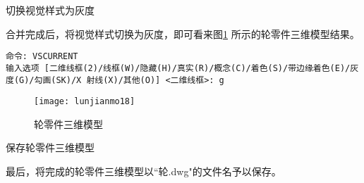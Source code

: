 \begin{procedure}
\item 切换视觉样式为灰度

合并完成后，将视觉样式切换为灰度，即可看来图\ref{fig:lunjianmo18} 所示的轮零件三维模型结果。
\begin{lstlisting}
命令: VSCURRENT
输入选项 [二维线框(2)/线框(W)/隐藏(H)/真实(R)/概念(C)/着色(S)/带边缘着色(E)/灰度(G)/勾画(SK)/X 射线(X)/其他(O)] <二维线框>: g
\end{lstlisting}

\begin{figure}[htbp]
\centering
\texttt{[image: lunjianmo18]}
\caption{轮零件三维模型}\label{fig:lunjianmo18}
\end{figure}
\item 保存轮零件三维模型

最后，将完成的轮零件三维模型以“轮.dwg"的文件名予以保存。
\end{procedure}
\endinput